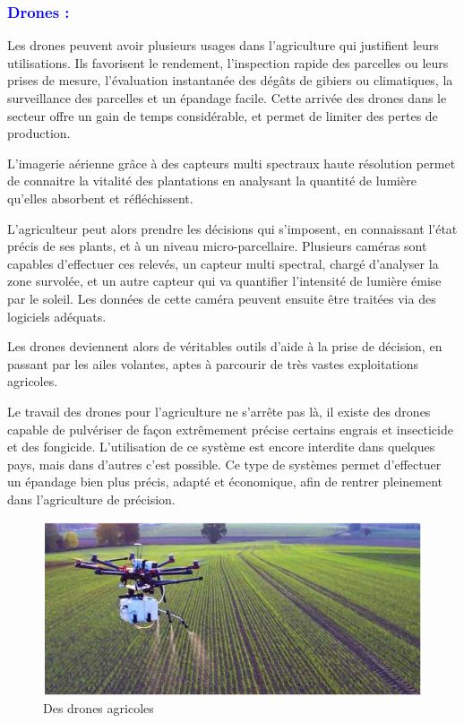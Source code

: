 \begin{flushleft}
	\subsubsection{\textcolor{blue}{Drones :}}
	Les drones peuvent avoir plusieurs usages dans l’agriculture qui justifient leurs utilisations. Ils favorisent le rendement, l’inspection rapide des parcelles ou	leurs prises de mesure, l’évaluation instantanée des dégâts de gibiers ou climatiques, la surveillance des parcelles et un épandage facile. Cette arrivée des drones dans le secteur offre un gain de temps considérable, et permet de limiter
	des pertes de production.
	
	L’imagerie aérienne grâce à des capteurs multi spectraux haute résolution permet de connaitre la vitalité des plantations en analysant la quantité de lumière qu’elles absorbent et réfléchissent.
	
	L’agriculteur peut alors prendre les décisions qui s’imposent, en connaissant l’état précis de ses plants, et à un niveau micro-parcellaire.
	Plusieurs caméras sont capables d’effectuer ces relevés, un capteur multi spectral, chargé d’analyser la zone survolée, et un autre capteur qui va quantifier l’intensité de lumière émise par le soleil. Les données de cette caméra peuvent ensuite être traitées via des logiciels adéquats.
	
	Les drones deviennent alors de véritables outils d’aide à la prise de décision, en passant par les ailes volantes, aptes à parcourir de très vastes exploitations agricoles.
	 	
	Le travail des drones pour l’agriculture ne s’arrête pas là, il existe des drones capable de pulvériser de façon extrêmement précise certains engrais et insecticide et des fongicide. L’utilisation de ce système est encore interdite dans quelques pays, mais dans d’autres c’est possible. Ce type de systèmes permet d’effectuer un épandage bien plus précis, adapté et économique, afin de rentrer pleinement dans l’agriculture de précision.
	\begin{figure}[h]
		\centering
		\includegraphics{chapitres/images/Drone.PNG}
		\caption{Des drones agricoles}
		\label{fig:labelname}
	\end{figure}
	

\end{flushleft}
